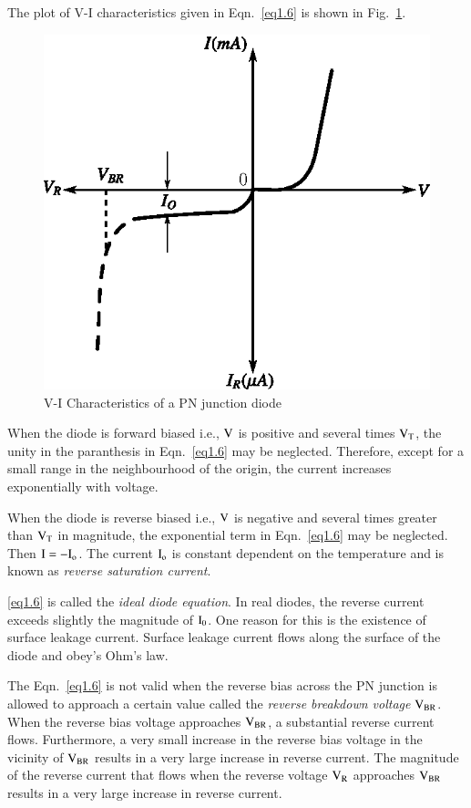 \medskip
The plot of V-I characteristics given in Eqn.~\eqref{eq1.6} is shown in Fig.~\ref{fig1.20}.
\begin{figure}[H]
\centering
\includegraphics{chap1/fig1.20.eps}
\caption{V-I Characteristics of a PN junction diode}\label{fig1.20}
\end{figure}

When the diode is forward biased i.e., $\textrm{V}$ is positive and several times $\textrm{V}_{\textrm{T}}$, the unity in the paranthesis in Eqn.~\eqref{eq1.6} may be neglected. Therefore, except for a small range in the neighbourhood of the origin, the current increases exponentially with voltage.

When the diode is reverse biased i.e., $\textrm{V}$ is negative and several times greater than $\textrm{V}_{\textrm{T}}$ in magnitude, the exponential term in Eqn.~\eqref{eq1.6} may be neglected. Then $\textrm{I} = -\textrm{I}_{\textrm{o}}$. The current $\textrm{I}_{\textrm{o}}$ is constant dependent on the temperature and is known as {\em reverse saturation current}.

\eqref{eq1.6} is called the {\em ideal diode equation}. In real diodes, the reverse current exceeds slightly the magnitude of $\textrm{I}_{0}$. One reason for this is the existence of surface leakage current. Surface leakage current flows along the surface of the diode and obey's Ohm's law.

The Eqn.~\eqref{eq1.6} is not valid when the reverse bias across the PN junction is allowed to approach a certain value called the {\em reverse breakdown voltage} $\textrm{V}_{\textrm{B}\textrm{R}}$. When the reverse bias voltage approaches $\textrm{V}_{\textrm{B}\textrm{R}}$, a substantial reverse current flows. Furthermore, a very small increase in the reverse bias voltage in the vicinity of $\textrm{V}_{\textrm{B}\textrm{R}}$ results in a very large increase in reverse current. The magnitude of the reverse current that flows when the reverse voltage $\textrm{V}_{\textrm{R}}$ approaches $\textrm{V}_{\textrm{B}\textrm{R}}$ results in a very large increase in reverse current.

